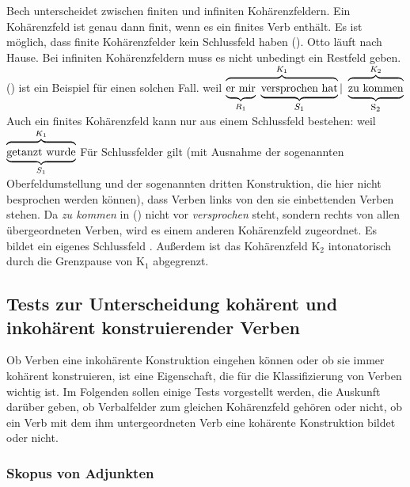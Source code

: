 Bech unterscheidet zwischen finiten und infiniten Kohärenzfeldern. Ein Kohärenzfeld ist genau
dann finit, wenn es ein finites Verb enthält. Es ist möglich, dass finite Kohärenzfelder 
kein Schlussfeld haben ().
\ea
Otto läuft nach Hause.
\z
Bei infiniten Kohärenzfeldern muss es nicht unbedingt ein Restfeld geben. () ist ein Beispiel
für einen solchen Fall.
\ea
weil ${\overbrace{\underbrace{\rule[-0.5ex]{0cm}{2.5ex}{\textrm{er~mir}}
                                   }_{R_1}~
                        \underbrace{\textrm{versprochen~hat}
                                   }_{\mbox{\footnotesize $S_1$}}}^{K_1}|~
        \overbrace{\underbrace{\rule[-0.5ex]{0cm}{2.5ex}{\textrm{zu~kommen}}
                              }_{\mbox{\footnotesize S$_2$}}}^{K_2}}$
\z
Auch ein finites Kohärenzfeld kann nur aus einem Schlussfeld bestehen:
\ea
weil ${\overbrace{\underbrace{\rule[-0.5ex]{0cm}{2.5ex}{\textrm{getanzt~wurde}}}_{S_1}}^{K_1}}$
\z
Für Schlussfelder gilt (mit Ausnahme der sogenannten Oberfeldumstellung und
der sogenannten dritten Konstruktion, die hier nicht besprochen werden
können), dass Verben links von den sie einbettenden Verben stehen. Da \emph{zu kommen} in ()
nicht vor \emph{versprochen} steht, sondern rechts von allen übergeordneten Verben, wird es einem
anderen Kohärenzfeld zugeordnet. Es bildet ein eigenes Schlussfeld \citep[\S 78]{Bech55a}. Außerdem
ist das Kohärenzfeld K$_2$ intonatorisch durch die Grenzpause von K$_1$ abgegrenzt.

\subsection{Tests zur Unterscheidung kohärent und inkohärent konstruierender Verben}
\label{sec-coh-incoh}

Ob Verben eine inkohärente Konstruktion eingehen können oder ob sie immer kohärent konstruieren,
ist eine Eigenschaft, die für die Klassifizierung von Verben wichtig ist. Im Folgenden sollen einige
Tests vorgestellt werden, die Auskunft darüber geben, ob Verbalfelder zum gleichen Kohärenzfeld
gehören oder nicht, \dash ob ein Verb mit dem ihm untergeordneten Verb eine kohärente Konstruktion
bildet oder nicht.

\subsubsection{Skopus von Adjunkten}
\label{sec-skopus-kohaerent}

